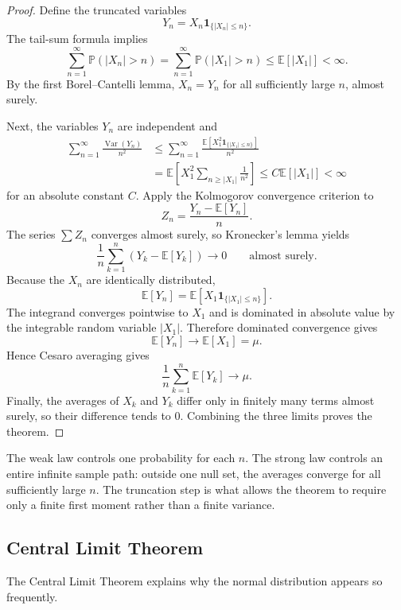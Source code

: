 \begin{proof}
Define the truncated variables
\[
    Y_n=X_n\mathbf{1}_{\{|X_n|\leq n\}}.
\]
The tail-sum formula implies
\[
    \sum_{n=1}^{\infty}\mathbb{P}(|X_n|>n)
    =\sum_{n=1}^{\infty}\mathbb{P}(|X_1|>n)
    \leq \mathbb{E}[|X_1|]<\infty.
\]
By the first Borel--Cantelli lemma, $X_n=Y_n$ for all sufficiently large $n$, almost surely.

Next, the variables $Y_n$ are independent and
\[
\begin{aligned}
    \sum_{n=1}^{\infty}
    \frac{\operatorname{Var}(Y_n)}{n^2}
    &\leq
    \sum_{n=1}^{\infty}
    \frac{\mathbb{E}[X_1^2\mathbf{1}_{\{|X_1|\leq n\}}]}{n^2}\\
    &=\mathbb{E}\left[
    X_1^2\sum_{n\geq |X_1|}\frac1{n^2}
    \right]
    \leq C\mathbb{E}[|X_1|]<\infty
\end{aligned}
\]
for an absolute constant $C$. Apply the Kolmogorov convergence criterion to
\[
    Z_n=\frac{Y_n-\mathbb{E}[Y_n]}{n}.
\]
The series $\sum Z_n$ converges almost surely, so Kronecker's lemma yields
\[
    \frac1n\sum_{k=1}^{n}
    \left(Y_k-\mathbb{E}[Y_k]\right)
    \longrightarrow0
    \qquad\text{almost surely}.
\]
Because the $X_n$ are identically distributed,
\[
    \mathbb{E}[Y_n]
    =\mathbb{E}\!\left[X_1\mathbf{1}_{\{|X_1|\le n\}}\right].
\]
The integrand converges pointwise to $X_1$ and is dominated in absolute value by the integrable random variable $|X_1|$. Therefore dominated convergence gives
\[
    \mathbb{E}[Y_n]\to\mathbb{E}[X_1]=\mu.
\] Hence Cesaro averaging gives
\[
    \frac1n\sum_{k=1}^{n}\mathbb{E}[Y_k]\to\mu.
\]
Finally, the averages of $X_k$ and $Y_k$ differ only in finitely many terms almost surely, so their difference tends to $0$. Combining the three limits proves the theorem.
\end{proof}

\begin{remark}
The weak law controls one probability for each $n$. The strong law controls an entire infinite sample path: outside one null set, the averages converge for all sufficiently large $n$. The truncation step is what allows the theorem to require only a finite first moment rather than a finite variance.
\end{remark}

\subsection{Central Limit Theorem}

The Central Limit Theorem explains why the normal distribution appears so frequently.

